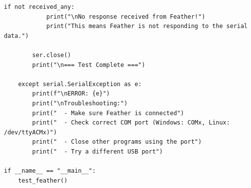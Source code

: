 \begin{lstlisting}[style=appendix-py, caption={Feather serial-communication test}, label={lst:test-feather}]
        if not received_any:
            print("\nNo response received from Feather!")
            print("This means Feather is not responding to the serial data.")

        ser.close()
        print("\n=== Test Complete ===")

    except serial.SerialException as e:
        print(f"\nERROR: {e}")
        print("\nTroubleshooting:")
        print("  - Make sure Feather is connected")
        print("  - Check correct COM port (Windows: COMx, Linux: /dev/ttyACMx)")
        print("  - Close other programs using the port")
        print("  - Try a different USB port")

if __name__ == "__main__":
    test_feather()
\end{lstlisting}

